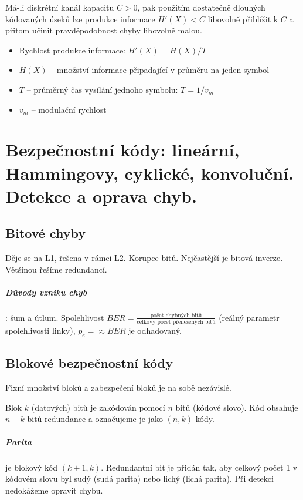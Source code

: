 \documentclass[a4paper, 11pt]{report}
\begin{document}
Má-li diskrétní kanál kapacitu $C > 0$, pak použitím dostatečně dlouhých kódovaných úseků lze produkce informace $H'(X) < C$ libovolně přiblížit k $C$ a přitom učinit pravděpodobnost chyby libovolně malou. 

\begin{itemize}
    \item Rychlost produkce informace: $H'(X) = H(X) / T$
    \item $H(X)$ -- množství informace připadající v průměru na jeden symbol
    \item $T$ -- průměrný čas vysílání jednoho symbolu: $T = 1 / v_m$
    \item $v_m$ -- modulační rychlost
\end{itemize}


\chapter{Bezpečnostní kódy: lineární, Hammingovy, cyklické, konvoluční. Detekce a oprava chyb.} \label{cha:38}

\section{Bitové chyby}
Děje se na L1, řešena v rámci L2. Korupce bitů. Nejčastější je bitová inverze. Většinou řešíme redundancí.

\paragraph{Důvody vzniku chyb}: šum a útlum.
Spolehlivost $BER = \frac{\text{počet chybných bitů}}{\text{celkový počet přenesených bitů}}$ (reálný parametr spolehlivosti linky),
$p_e = \approx BER$ je odhadovaný.

\section{Blokové bezpečnostní kódy}
Fixní množství bloků a zabezpečení bloků je na sobě nezávislé.

Blok $k$ (datových) bitů je zakódován pomocí $n$ bitů (kódové slovo). Kód obsahuje $n-k$ bitů redundance a označujeme je jako $(n, k)$ kódy.

\paragraph{Parita} je blokový kód $(k+1, k)$. Redundantní bit je přidán tak, aby celkový počet 1 v kódovém slovu byl sudý (sudá parita) nebo lichý (lichá parita). Při detekci nedokážeme opravit chybu.
\end{document}
